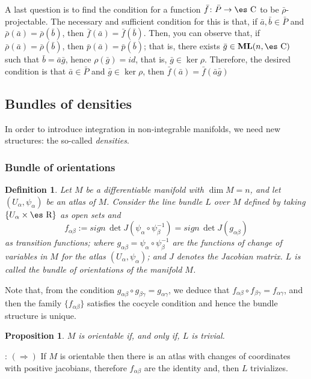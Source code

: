 \documentclass[12pt]{article}
\theoremstyle{plain}
\newtheorem{prop}{Proposition}
\newtheorem{definition}{Definition}
\def\ML{{\bf ML}(n,\Complex )}
\def\Real{\mbox{\es R}}
\def\Complex{\mbox{\es C}}
\begin{document}
\noindent A last question is to find the condition for a function $\bar f\colon
\bar P \to \Complex$
to be $\bar \rho$-projectable.
The necessary and sufficient condition for this is that, if
 $\bar a,\bar b \in \bar P$ and
 $\bar \rho (\bar a) = \bar \rho (\bar b)$,
 then $\bar f(\bar a) = \bar f(\bar b)$.
Then, you can observe that, if $\bar \rho (\bar a) = \bar \rho (\bar
b)$,
then $\bar p (\bar a) = \bar p (\bar b)$; that is, there exists
$\bar g \in \ML$ such that $\bar b = \bar a \bar g$,
hence $\rho(\bar g) = id$, that is, $\bar g \in \ker \rho$.
Therefore, the desired condition is that $\bar a \in \bar P$ and
$\bar g \in \ker \rho$, then $\bar f(\bar a) = \bar f(\bar a \bar g)$



\subsection{Bundles of densities}


In order to introduce integration in non-integrable manifolds, we need
new
structures: the so-called {\it densities}.


\subsubsection{Bundle of orientations}


\begin{definition}
Let $M$ be a differentiable manifold with $\dim M = n$,
and let $(U_{\alpha},\psi_{\alpha})$ be an atlas of $M$.
Consider the line bundle $L$ over $M$ defined by taking
$\{ U_{\alpha} \times \Real \}$ as open sets and
$$
f_{\alpha \beta} :=
sign\, \det J(\psi_{\alpha} \circ \psi_{\beta}^{-1})=
sign\, \det J(g_{\alpha \beta})
$$
as transition functions; where $g_{\alpha \beta} = \psi_{\alpha} \circ
\psi_{\beta}^{-1}$
are the functions of change of variables in $M$ for the atlas
$(U_{\alpha},\psi_{\alpha})$; and $J$ denotes the Jacobian matrix.
$L$ is called the {\rm bundle of orientations} of the manifold $M$.
\label{fo}
\end {definition}

Note that, from the condition
$g_{\alpha \beta} \circ g_{\beta \gamma} = g_{\alpha \gamma}$,
we deduce that $f_{\alpha \beta} \circ f_{\beta \gamma} = f_{\alpha
\gamma}$,
and then the family $\{ f_{\alpha \beta} \}$ satisfies the cocycle
condition and hence
the bundle structure is unique.

\begin{prop}
$M$ is orientable if, and only if, $L$ is trivial.
\label{jusfo}
\end{prop}
: 
$(\Longrightarrow)$ \quad
If $M$ is orientable then there is an atlas with changes of coordinates
with positive jacobians,
therefore $f_{\alpha \beta}$ are the identity and, then $L$ trivializes.
\end{document}

